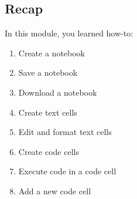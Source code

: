 \documentclass[svgnames, 11pt, lettersize]{article}
\begin{document}
\subsection{Recap}
\label{sec:org97659c7}
In this module, you learned how-to:

\begin{enumerate}
\item Create a notebook 
\item Save a notebook 
\item Download a notebook 
\item Create text cells  
\item Edit and format text cells    
\item Create code cells 
\item Execute code in a code cell  
\item Add a new code cell  
\end{enumerate}
\end{document}
